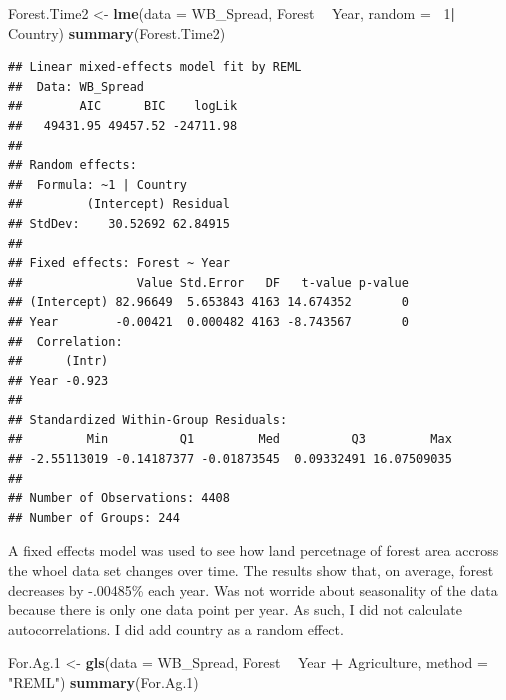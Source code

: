 \documentclass[12pt,]{article}
\newenvironment{Shaded}{\begin{snugshade}}{\end{snugshade}}
\newcommand{\KeywordTok}[1]{\textcolor[rgb]{0.13,0.29,0.53}{\textbf{#1}}}
\newcommand{\DataTypeTok}[1]{\textcolor[rgb]{0.13,0.29,0.53}{#1}}
\newcommand{\DecValTok}[1]{\textcolor[rgb]{0.00,0.00,0.81}{#1}}
\newcommand{\StringTok}[1]{\textcolor[rgb]{0.31,0.60,0.02}{#1}}
\newcommand{\OperatorTok}[1]{\textcolor[rgb]{0.81,0.36,0.00}{\textbf{#1}}}
\newcommand{\NormalTok}[1]{#1}
\begin{document}
\begin{Shaded}
\begin{Highlighting}[]
\NormalTok{Forest.Time2 <-}\StringTok{ }\KeywordTok{lme}\NormalTok{(}\DataTypeTok{data =}\NormalTok{ WB_Spread,}
\NormalTok{                Forest }\OperatorTok{~}\StringTok{ }\NormalTok{Year,}
                \DataTypeTok{random =} \OperatorTok{~}\DecValTok{1}\OperatorTok{|}\StringTok{ }\NormalTok{Country)}
\KeywordTok{summary}\NormalTok{(Forest.Time2)}
\end{Highlighting}
\end{Shaded}

\begin{verbatim}
## Linear mixed-effects model fit by REML
##  Data: WB_Spread 
##        AIC      BIC    logLik
##   49431.95 49457.52 -24711.98
## 
## Random effects:
##  Formula: ~1 | Country
##         (Intercept) Residual
## StdDev:    30.52692 62.84915
## 
## Fixed effects: Forest ~ Year 
##                Value Std.Error   DF   t-value p-value
## (Intercept) 82.96649  5.653843 4163 14.674352       0
## Year        -0.00421  0.000482 4163 -8.743567       0
##  Correlation: 
##      (Intr)
## Year -0.923
## 
## Standardized Within-Group Residuals:
##         Min          Q1         Med          Q3         Max 
## -2.55113019 -0.14187377 -0.01873545  0.09332491 16.07509035 
## 
## Number of Observations: 4408
## Number of Groups: 244
\end{verbatim}

A fixed effects model was used to see how land percetnage of forest area
accross the whoel data set changes over time. The results show that, on
average, forest decreases by -.00485\% each year. Was not worride about
seasonality of the data because there is only one data point per year.
As such, I did not calculate autocorrelations. I did add country as a
random effect.

\begin{Shaded}
\begin{Highlighting}[]
\NormalTok{For.Ag.}\DecValTok{1}\NormalTok{ <-}\StringTok{ }\KeywordTok{gls}\NormalTok{(}\DataTypeTok{data =}\NormalTok{ WB_Spread, }
\NormalTok{                    Forest }\OperatorTok{~}\StringTok{ }\NormalTok{Year }\OperatorTok{+}\StringTok{ }\NormalTok{Agriculture,}
                    \DataTypeTok{method =} \StringTok{"REML"}\NormalTok{)}
\KeywordTok{summary}\NormalTok{(For.Ag.}\DecValTok{1}\NormalTok{)}
\end{Highlighting}
\end{Shaded}
\end{document}
